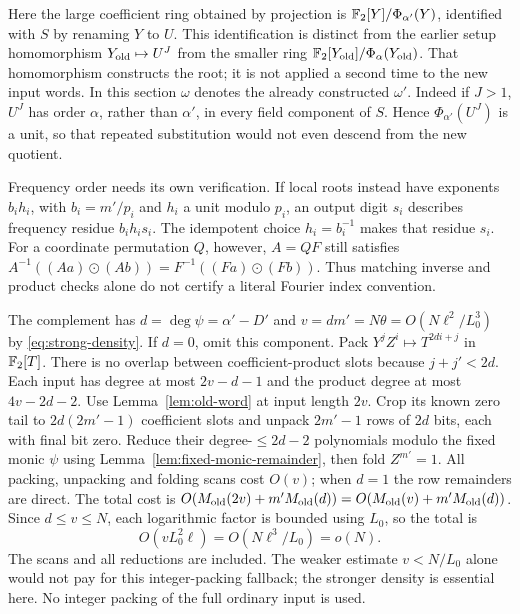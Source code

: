 Here the large coefficient ring obtained by projection is
$\mathbb F_2[Y]/\Phi_{\alpha'}(Y)$, identified with $S$ by renaming $Y$ to $U$.
This identification is distinct from the earlier setup homomorphism
$Y_{\rm old}\mapsto U^J$ from the smaller ring
$\mathbb F_2[Y_{\rm old}]/\Phi_\alpha(Y_{\rm old})$. That homomorphism constructs
the root; it is not applied a second time to the new input words.
In this section $\omega$ denotes the already constructed $\omega'$.
Indeed if $J>1$, $U^J$ has order $\alpha$, rather than $\alpha'$,
in every field component of $S$. Hence $\Phi_{\alpha'}(U^J)$ is a
unit, so that repeated substitution would not even descend from the
new quotient.

Frequency order needs its own verification. If local roots instead have
exponents $b_i h_i$, with $b_i=m'/p_i$ and $h_i$ a unit modulo $p_i$,
an output digit $s_i$ describes frequency residue $b_i h_i s_i$.
The idempotent choice $h_i=b_i^{-1}$ makes that residue $s_i$.
For a coordinate permutation $Q$, however, $A=QF$ still satisfies
$A^{-1}((Aa)\odot(Ab))=F^{-1}((Fa)\odot(Fb))$.
Thus matching inverse and product checks alone do not certify a
literal Fourier index convention.

The complement has $d=\deg\psi=\alpha'-D'$ and
$v=dm'=N\theta=O(N\ell^2/L_0^3)$ by \eqref{eq:strong-density}.
If $d=0$, omit this component.
Pack $Y^jZ^i\mapsto T^{2di+j}$ in $\mathbb F_2[T]$. There is no overlap
between coefficient-product slots because $j+j'<2d$.
Each input has degree at most $2v-d-1$ and the product degree at most
$4v-2d-2$. Use Lemma~\ref{lem:old-word} at input length $2v$.
Crop its known zero tail to $2d(2m'-1)$ coefficient slots and unpack
$2m'-1$ rows of $2d$ bits, each with final bit zero.
Reduce their degree-$\le2d-2$ polynomials modulo the fixed monic
$\psi$ using Lemma~\ref{lem:fixed-monic-remainder}, then fold
$Z^{m'}=1$. All packing, unpacking and folding scans cost $O(v)$;
when $d=1$ the row remainders are direct.
The total cost is
$O(M_{\rm old}(2v)+m'M_{\rm old}(d))
 =O(M_{\rm old}(v)+m'M_{\rm old}(d))$. Since
$d\le v\le N$, each logarithmic factor is bounded using $L_0$,
so the total is
\[
 O(vL_0^2\ell)=O(N\ell^3/L_0)=o(N).
\]
The scans and all reductions are included. The weaker estimate
$v<N/L_0$ alone would not pay for this integer-packing fallback;
the stronger density is essential here. No integer packing of the
full ordinary input is used.

